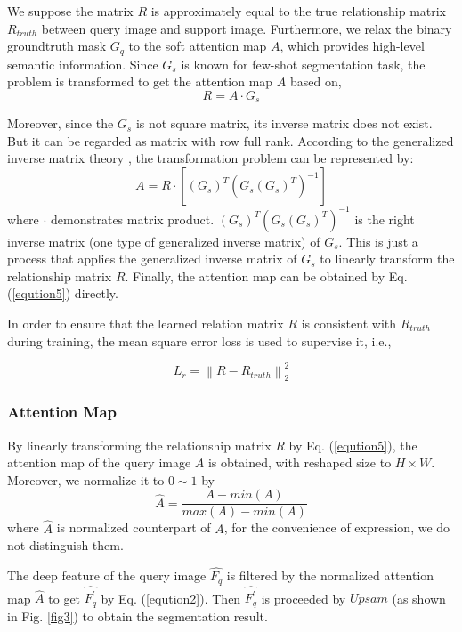 \documentclass[runningheads]{llncs}
\begin{document}
We suppose the matrix $R$ is approximately equal to the true relationship matrix $R_{truth}$ between query image and support image. Furthermore, we relax the binary groundtruth mask $G_q$ to the soft attention map $A$, which provides high-level semantic information. Since $G_{s}$ is known for few-shot segmentation task, the problem is transformed to get the attention map $A$ based on, 
\begin{equation}
 R = A \cdot G_{s}
\label{eqution20}
\end{equation}

Moreover, since the $G_s$ is not square matrix, its inverse matrix does not exist. But it can be regarded as matrix with row full rank. According to the generalized inverse matrix theory \cite{ref_inverse}, the transformation problem can be represented by:
\begin{equation}
A = R \cdot [(G_s)^{T}(G_s(G_s)^{T})^{-1}]
\label{eqution5}
\end{equation}
where $\cdot$ demonstrates matrix product. $(G_s)^{T}(G_s(G_s)^{T})^{-1}$ is the right inverse matrix (one type of generalized inverse matrix) of $G_s$. This is just a process that applies the generalized inverse matrix of $G_s$ to linearly transform the relationship matrix $R$. Finally, the attention map can be obtained by Eq. (\ref{eqution5}) directly.


In order to ensure that the learned relation matrix $R$ is consistent with $R_{truth}$ during training, the mean square error loss is used to supervise it, i.e., 

\begin{equation}
L_{r} = \left \|R-R_{truth} \right \|_{2}^2
\label{eqution6}
\end{equation}

\subsubsection{Attention Map}
By linearly transforming the relationship matrix $R$ by Eq. (\ref{eqution5}), the attention map of the query image $A$ is obtained, with reshaped size to $H \times W$. Moreover, we normalize it to $0 \sim 1$ by
\begin{equation}
\hat{A} = \frac{A-min(A)}{max(A)-min(A)}
\label{eqution7}
\end{equation}
where $\hat{A}$ is normalized counterpart of $A$, for the convenience of expression, we do not distinguish them.

The deep feature of the query image $\hat{F_q}$ is filtered by the normalized attention map $\hat{A}$ to get $\hat{F_q^{'}}$ by Eq. (\ref{eqution2}). Then $\hat{F_q^{'}}$ is proceeded by $Upsam$ (as shown in Fig. \ref{fig3}) to obtain the segmentation result.
\end{document}
